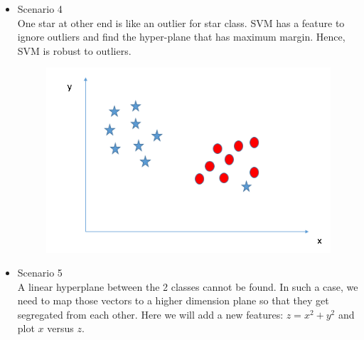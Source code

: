 \documentclass[a4paper,12pt]{report}
\begin{document}
\begin{appendices}
\begin{itemize}
\item Scenario 4 \\
One star at other end is like an outlier for star class. SVM has a feature to ignore outliers and find the hyper-plane that has maximum margin. Hence, SVM is robust to outliers.
\begin{figure}[H]
	\centering
        \includegraphics[totalheight=4 cm]{SVM_61.png}
\end{figure}
\end{itemize}

\begin{itemize}
\item Scenario 5 \\
A linear hyperplane between the 2 classes cannot be found. In such a case, we need to map  those vectors to a higher dimension plane so that they get segregated from each other. Here we will add a new features: $z = x^2 + y^2 $ and plot $x$ versus $z$.


\end{itemize}
\end{appendices}
\end{document}
